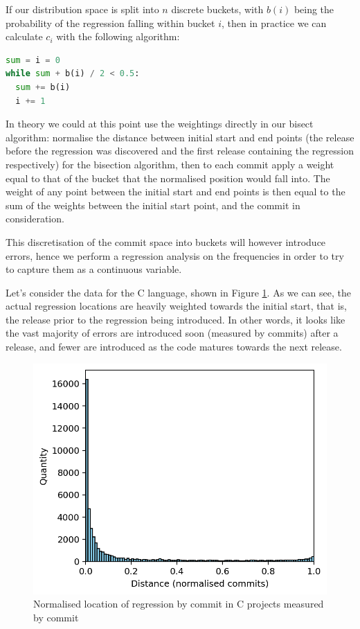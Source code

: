 \documentclass[pdflatex, sn-mathphys, referee]{sn-jnl}%
\theoremstyle{thmstyleone}%
\theoremstyle{thmstyletwo}%
\theoremstyle{thmstylethree}%
\theoremstyle{thmstyleone}
\begin{document}
If our distribution space is split into $n$ discrete buckets, with $b(i)$ being the probability of the regression falling within bucket $i$, then in practice we can calculate $c_i$ with the following algorithm:

\begin{lstlisting}[language=Python]
sum = i = 0
while sum + b(i) / 2 < 0.5:
  sum += b(i)
  i += 1
\end{lstlisting}

In theory we could at this point use the weightings directly in our bisect algorithm: normalise the distance between initial start and end points (the release before the regression was discovered and the first release containing the regression respectively) for the bisection algorithm, then to each commit apply a weight equal to that of the bucket that the normalised position would fall into. The weight of any point between the initial start and end points is then equal to the sum of the weights between the initial start point, and the commit in consideration.

This discretisation of the commit space into buckets will however introduce errors, hence we perform a regression analysis on the frequencies in order to try to capture them as a continuous variable.

Let's consider the data for the C language, shown in Figure \ref{fig:c-commits}. As we can see, the actual regression locations are heavily weighted towards the initial start, that is, the release prior to the regression being introduced. In other words, it looks like the vast majority of errors are introduced soon (measured by commits) after a release, and fewer are introduced as the code matures towards the next release.

\begin{figure}[t]
\centering
\includegraphics[width=0.7\columnwidth]{Fig1}%
\caption{\label{fig:c-commits}Normalised location of regression by commit in C projects measured by commit}
\end{figure}
\end{document}
